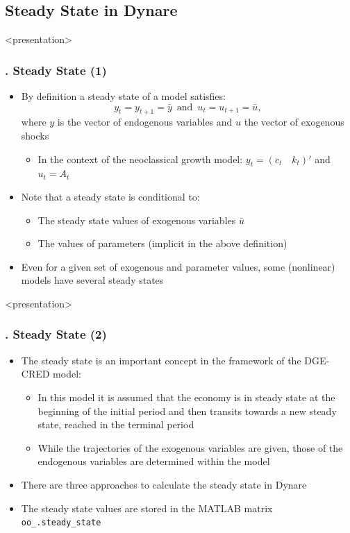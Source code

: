 \documentclass[11pt,aspectratio=169]{beamer}
\begin{document}
\subsection{Steady State in Dynare}
\begin{frame}<presentation>
	\frametitle{{\thesection.\thesubsection} Steady State (1)}
	\begin{itemize}
		\item By definition a steady state of a model satisfies: $$y_t=y_{t+1}=\bar{y} \enspace \text{and} \enspace u_t=u_{t+1}=\bar{u},$$
		where $y$ is the vector of endogenous variables and $u$ the vector of exogenous shocks
		\begin{itemize}
			\item In the context of the neoclassical growth model: $y_t=(c_t \quad k_t)'$ and $u_t=A_t$
		\end{itemize}
		\item Note that a steady state is conditional to:
		\begin{itemize}
			\item The steady state values of exogenous variables $\bar{u}$
			\item The values of parameters (implicit in the above definition)
		\end{itemize}
		\item Even for a given set of exogenous and parameter values, some (nonlinear) models have several steady states
	\end{itemize}
\end{frame}
\begin{frame}<presentation>
	\frametitle{{\thesection.\thesubsection} Steady State (2)}
	\begin{itemize}
		\item The steady state is an important concept in the framework of the DGE-CRED model:
		\begin{itemize}
			\item In this model it is assumed that the economy is in steady state at the beginning of the initial period and then transits towards a new steady state, reached in the terminal period
			\item While the trajectories of the exogenous variables are given, those of the endogenous variables are determined within the model
		\end{itemize}
		\item There are three approaches to calculate the steady state in Dynare
		\item The steady state values are stored in the MATLAB matrix \texttt{oo\_.steady\_state}
	\end{itemize}
\end{frame}
\end{document}
